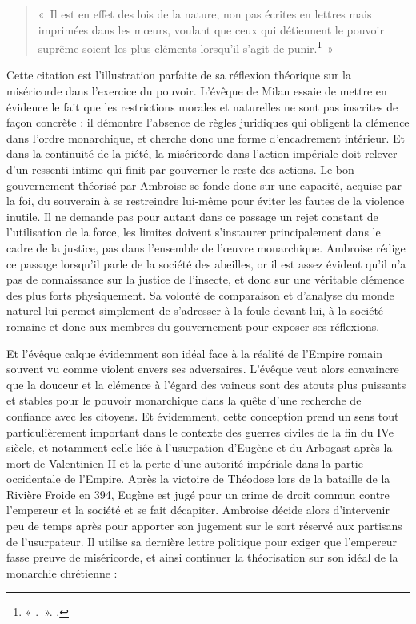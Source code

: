 \bigskip

\begin{quote}
    «~Il est en effet des lois de la nature, non pas écrites en lettres mais imprimées dans les mœurs, voulant que ceux qui détiennent le pouvoir suprême soient les plus cléments lorsqu'il s'agit de punir.\footnote{« .~». \cite[V, 21, 68]{ambroise_csel_32_1}.}~»
\end{quote}

\bigskip

Cette citation est l'illustration parfaite de sa réflexion théorique sur la miséricorde dans l'exercice du pouvoir. L'évêque de Milan essaie de mettre en évidence le fait que les restrictions morales et naturelles ne sont pas inscrites de façon concrète : il démontre l'absence de règles juridiques qui obligent la clémence dans l'ordre monarchique, et cherche donc une forme d'encadrement intérieur. Et dans la continuité de la piété, la miséricorde dans l'action impériale doit relever d'un ressenti intime qui finit par gouverner le reste des actions. Le bon gouvernement théorisé par Ambroise se fonde donc sur une capacité, acquise par la foi, du souverain à se restreindre lui-même pour éviter les fautes de la violence inutile. Il ne demande pas pour autant dans ce passage un rejet constant de l'utilisation de la force, les limites doivent s'instaurer principalement dans le cadre de la justice, pas dans l'ensemble de l'œuvre monarchique. Ambroise rédige ce passage lorsqu'il parle de la société des abeilles, or il est assez évident qu'il n'a pas de connaissance sur la justice de l'insecte, et donc sur une véritable clémence des plus forts physiquement. Sa volonté de comparaison et d'analyse du monde naturel lui permet simplement de s'adresser à la foule devant lui, à la société romaine et donc aux membres du gouvernement pour exposer ses réflexions.

\bigskip

Et l'évêque calque évidemment son idéal face à la réalité de l'Empire romain souvent vu comme violent envers ses adversaires. L'évêque veut alors convaincre que la douceur et la clémence à l'égard des vaincus sont des atouts plus puissants et stables pour le pouvoir monarchique dans la quête d'une recherche de confiance avec les citoyens. Et évidemment, cette conception prend un sens tout particulièrement important dans le contexte des guerres civiles de la fin du IVe siècle, et notamment celle liée à l'usurpation d'Eugène et du  Arbogast après la mort de Valentinien II et la perte d'une autorité impériale dans la partie occidentale de l'Empire. Après la victoire de Théodose lors de la bataille de la Rivière Froide en 394, Eugène est jugé pour un crime de droit commun contre l'empereur et la société et se fait décapiter. Ambroise décide alors d'intervenir peu de temps après pour apporter son jugement sur le sort réservé aux partisans de l'usurpateur. Il utilise sa dernière lettre politique pour exiger que l'empereur fasse preuve de miséricorde, et ainsi continuer la théorisation sur son idéal de la monarchie chrétienne :

